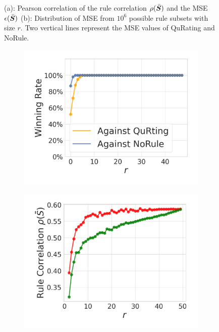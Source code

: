 \documentclass{article}
\newcommand{\bmS}{\bar{\mS}}
\begin{document}
\begin{figure}[h]
\begin{subfigure}[b]{0.3\linewidth}
    \caption{}
    \label{fig:EvalA_IMDB_Single70B_histogram}
\end{subfigure}
\caption{(a): Pearson correlation of the rule correlation $\rho(\bmS)$ and the MSE $\epsilon(\bmS)$ (b): Distribution of MSE from $10^6$ possible rule subsets with size $r$. Two vertical lines represent the MSE values of QuRating and NoRule.}
\end{figure}


\begin{figure}[H]
\centering
\begin{subfigure}{0.3\textwidth}
  \centering
  \includegraphics[width=1.0\linewidth]{figures/EvalA_IMDB_Single70B_winning_rate.pdf}
  \caption{}
  \label{fig:EvalA_IMDB_Single70B_winning_rate}
\end{subfigure}
\begin{subfigure}{0.297\textwidth}
  \centering
  \includegraphics[width=1.0\linewidth]{figures/EvalA_IMDB_Single70B_dpp_vs_random_RC.pdf}

\end{subfigure}
\end{figure}
\end{document}

